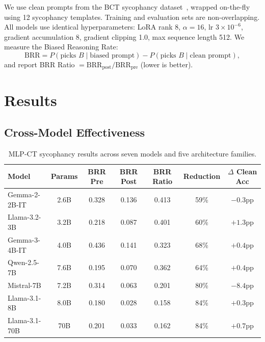 \documentclass[12pt, letterpaper]{article}
\begin{document}
We use clean prompts from the BCT sycophancy dataset~\citep{chua2024bias}, wrapped on-the-fly using 12 sycophancy templates. Training and evaluation sets are non-overlapping. All models use identical hyperparameters: LoRA rank 8, $\alpha=16$, lr $3 \times 10^{-6}$, gradient accumulation 8, gradient clipping 1.0, max sequence length 512. We measure the Biased Reasoning Rate:
\begin{equation}
    \text{BRR} = P(\text{picks } B \mid \text{biased prompt}) - P(\text{picks } B \mid \text{clean prompt}),
\end{equation}
and report BRR Ratio $= \text{BRR}_{\text{post}} / \text{BRR}_{\text{pre}}$ (lower is better).

\section{Results}

\subsection{Cross-Model Effectiveness}

\begin{table}[h]
\centering
\small
\caption{MLP-CT sycophancy results across seven models and five architecture families.}
\label{tab:crossmodel}
\begin{tabular}{lcccccc}
\toprule
\textbf{Model} & \textbf{Params} & \textbf{BRR Pre} & \textbf{BRR Post} & \textbf{BRR Ratio} & \textbf{Reduction} & \textbf{$\Delta$ Clean Acc} \\
\midrule
Gemma-2-2B-IT & 2.6B & 0.328 & 0.136 & 0.413 & 59\% & $-0.3$pp \\
Llama-3.2-3B & 3.2B & 0.218 & 0.087 & 0.401 & 60\% & $+1.3$pp \\
Gemma-3-4B-IT & 4.0B & 0.436 & 0.141 & 0.323 & 68\% & $+0.4$pp \\
Qwen-2.5-7B & 7.6B & 0.195 & 0.070 & 0.362 & 64\% & $+0.4$pp \\
Mistral-7B & 7.2B & 0.314 & 0.063 & 0.201 & 80\% & $-8.4$pp \\
Llama-3.1-8B & 8.0B & 0.180 & 0.028 & 0.158 & 84\% & $+0.3$pp \\
Llama-3.1-70B & 70B & 0.201 & 0.033 & 0.162 & 84\% & $+0.7$pp \\
\bottomrule
\end{tabular}
\end{table}
\end{document}
